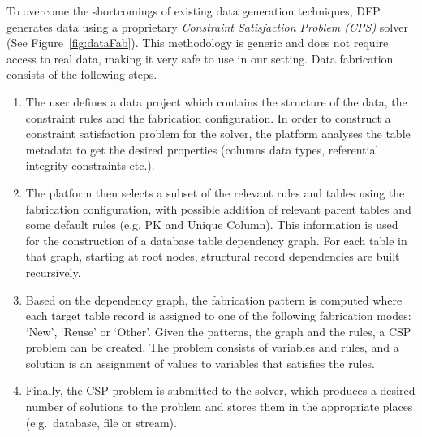 To overcome the shortcomings of existing data generation techniques, DFP generates data using a proprietary \emph{Constraint Satisfaction Problem (CPS)} solver (See Figure~\ref{fig:dataFab}). This methodology is generic and does not require access to real data, making it very safe to use in our setting. Data fabrication consists of the following steps.
\begin{enumerate}
\item The user defines a data project which contains the structure of the data, the constraint rules and the fabrication configuration. In order to construct a constraint satisfaction problem for the solver, the platform analyses the table metadata to get the desired properties (columns data types, referential integrity constraints etc.). 
\item The platform then selects a subset of the relevant rules and tables using the fabrication configuration, with possible addition of relevant parent tables and some default rules (e.g. PK and Unique Column). This information is used for the construction of a database table dependency graph. For each table in that graph, starting at root nodes, structural record dependencies are built recursively.
\item Based on the dependency graph, the fabrication pattern is computed where each target table record is assigned to one of the following fabrication modes: ‘New’, ‘Reuse’ or ‘Other’. Given the patterns, the graph and the rules, a CSP problem can be created. The problem consists of variables and rules, and a solution is an assignment of values to variables that satisfies the rules. 
\item Finally, the CSP problem is submitted to the solver, which produces a desired number of solutions to the problem and stores them in the appropriate places (e.g.~database, file or stream).
\end{enumerate} 

